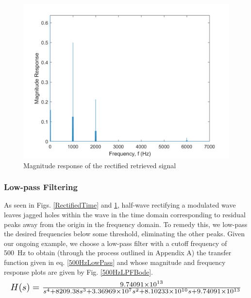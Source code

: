 \documentclass[journal]{IEEEtran}
\begin{document}
\begin{figure}[ht]
	\centering
  \includegraphics[width=\columnwidth]{HalfWaveMag.png}
    \caption{Magnitude response of the rectified retrieved signal}   
    \label{RectifiedResponse}
\end{figure}


\subsubsection{Low-pass Filtering}
As seen in Figs. \ref{RectifiedTime} and \ref{RectifiedResponse}, half-wave rectifying a modulated wave leaves jagged holes within the wave in the time domain corresponding to residual peaks away from the origin in the frequency domain. To remedy this, we low-pass the desired frequencies below some threshold, eliminating the other peaks. Given our ongoing example, we choose a low-pass filter with a cutoff frequency of \SI{500}{\hertz} to obtain (through the process outlined in Appendix A) the transfer function given in eq. \eqref{500HzLowPass} and whose magnitude and frequency response plots are given by Fig. \ref{500HzLPFBode}.
\begin{equation}
    \resizebox{\columnwidth}{!}{%
$H(s)=\frac{9.74091\times 10^{13}}{s^4+8209.38 s^3+3.36969\times 10^7 s^2+8.10233\times 10^{10} s+9.74091\times 10^{13}}$%
}
\label{500HzLowPass}
\end{equation}
\end{document}
